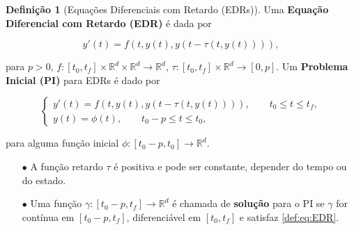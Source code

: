 \documentclass{beamer}
\newcommand{\R}{\mathbb{R}}
\theoremstyle{plain}
\theoremstyle{definition}
\newtheorem{defi}{Definição}
\begin{document}
\begin{frame}
        \footnotesize
    \begin{defi}[Equações Diferenciais com Retardo (EDRs)]

        Uma \textbf{Equação Diferencial com Retardo (EDR)} é dada por

        \begin{equation}
            y'(t) = f(t, y(t), y(t - \tau(t, y(t)))),
        \end{equation}

        para $p > 0$, $f:[t_0, t_f] \times \R^d \times \R^d \to \R^d$, $\tau: [t_0, t_f] \times \R^d \to [0, p]$. Um \textbf{Problema Inicial (PI)} para EDRs é dado por

        \begin{equation}  
            \begin{cases}
                y'(t) = f(t, y(t), y(t - \tau(t, y(t)))), \qquad t_0 \leq t \leq t_f , \\
                y(t) = \phi(t), \qquad t_0 - p \leq t \leq t_0, 
            \end{cases}
            \label{def:eq:EDR}
        \end{equation}

        para alguma função inicial $\phi:[t_0 - p, t_0] \to \R^d$.


        \begin{itemize}
            \item[$\bullet$] A função retardo $\tau$ é positiva e pode ser constante, depender do tempo ou do estado.
            \item[$\bullet$] Uma função $\gamma:[t_0 - p, t_f] \to \R^d$ é chamada de \textbf{solução} para o PI se $\gamma$ for contínua em $[t_0 - p, t_f]$, diferenciável em $[t_0, t_f]$ e satisfaz \eqref{def:eq:EDR}.

        \end{itemize}
    \end{defi}


\end{frame}

\end{document}
